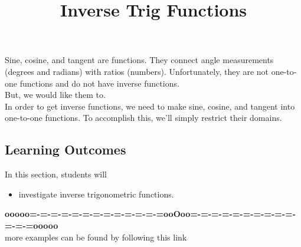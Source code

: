 \documentclass{ximera}
\title{Inverse Trig Functions}
\begin{document}
\begin{abstract}
%
\end{abstract}
\maketitle




Sine, cosine, and tangent are functions. They connect angle measurements (degrees and radians) with ratios (numbers). Unfortunately, they are not one-to-one functions and do not have inverse functions. \\

But, we would like them to.\\

In order to get inverse functions, we need to make sine, cosine, and tangent into one-to-one functions.  To accomplish this, we'll simply restrict their domains.














\subsection{Learning Outcomes}

\begin{sectionOutcomes}
In this section, students will 

\begin{itemize}
\item investigate inverse trigonometric functions.
\end{itemize}
\end{sectionOutcomes}








\begin{center}
\textbf{\textcolor{green!50!black}{ooooo=-=-=-=-=-=-=-=-=-=-=-=-=ooOoo=-=-=-=-=-=-=-=-=-=-=-=-=ooooo}} \\

more examples can be found by following this link\\ 

\end{center}
\end{document}
